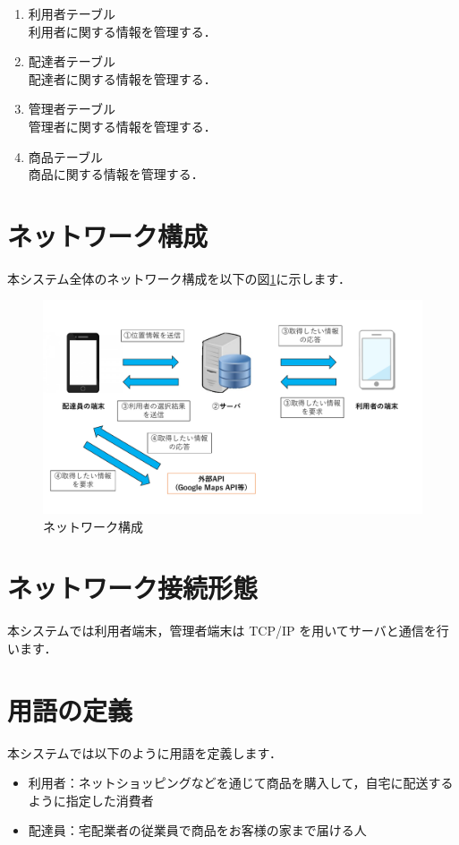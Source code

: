 \documentclass[a4j,titlepage]{jarticle}
\begin{document}
\begin{enumerate}
\item 利用者テーブル\\
  利用者に関する情報を管理する．
\item 配達者テーブル\\
  配達者に関する情報を管理する．
\item 管理者テーブル\\
  管理者に関する情報を管理する．
\item 商品テーブル\\
  商品に関する情報を管理する．
\end{enumerate}

\section{ネットワーク構成}
本システム全体のネットワーク構成を以下の図\ref{fig:i_f}に示します．

\begin{figure}[htbp]
 \begin{center}
  \includegraphics[width=140mm]{information_flow.pdf}
	\caption{ネットワーク構成}
	\label{fig:i_f}
 \end{center}

\end{figure}


\section{ネットワーク接続形態}
本システムでは利用者端末，管理者端末は TCP/IP を用いてサーバと通信を行います．


\section{用語の定義}
本システムでは以下のように用語を定義します．
\begin{itemize}
 \item 利用者：ネットショッピングなどを通じて商品を購入して，自宅に配送するように指定した消費者
 \item 配達員：宅配業者の従業員で商品をお客様の家まで届ける人
\end{itemize}
\end{document}
